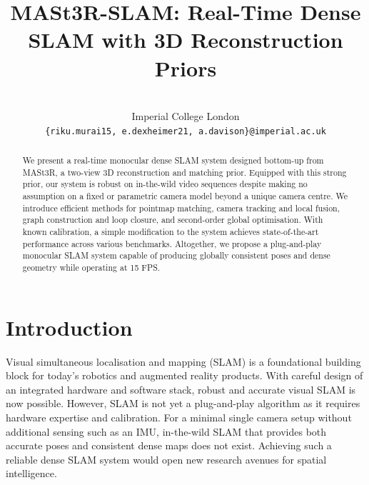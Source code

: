 \documentclass[10pt,twocolumn,letterpaper]{article}
\title{MASt3R-SLAM: Real-Time Dense SLAM with 3D Reconstruction Priors}
\author{
    \makebox[0.32\textwidth][r]{Riku Murai\textsuperscript{*}} %
    \makebox[0.32\textwidth][c]{Eric Dexheimer\textsuperscript{*}} %
    \makebox[0.32\textwidth][l]{Andrew J. Davison} \\ %
    Imperial College London\\
    {\tt\small \{riku.murai15, e.dexheimer21, a.davison\}@imperial.ac.uk} \\
}
\begin{document}
\maketitle
\begin{abstract}
We present a real-time monocular dense SLAM system designed bottom-up from MASt3R, a two-view 3D reconstruction and matching prior.  Equipped with this strong prior, our system is robust on in-the-wild video sequences despite making no assumption on a fixed or parametric camera model beyond a unique camera centre.  We introduce efficient methods for pointmap matching, camera tracking and local fusion, graph construction and loop closure, and second-order global optimisation. With known calibration, a simple modification to the system achieves state-of-the-art performance across various benchmarks.  Altogether, we propose a plug-and-play monocular SLAM system capable of producing globally consistent poses and dense geometry while operating at 15 FPS.
\end{abstract}
{}
\section{Introduction}

Visual simultaneous localisation and mapping (SLAM) is a foundational building block for today's robotics and augmented reality products.
With careful design of an integrated hardware and software stack, robust and accurate visual SLAM is now possible.
However, SLAM is not yet a plug-and-play algorithm as it requires hardware expertise and calibration.
For a minimal single camera setup without additional sensing such as an IMU, in-the-wild SLAM that provides both accurate poses and consistent dense maps does not exist.  Achieving such a reliable dense SLAM system would open new research avenues for spatial intelligence.
\end{document}
